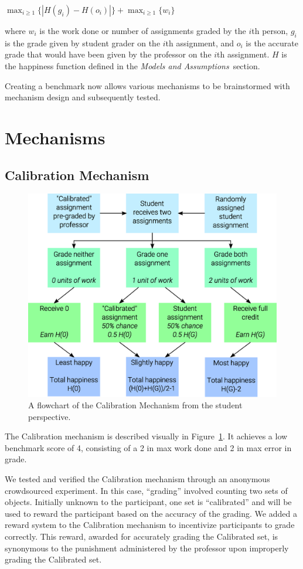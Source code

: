\documentclass{chi-ext}
\begin{document}
$\max_{i \ge 1} \{|H(g_i)-H(o_i)|\} + \max_{i \ge 1} \{w_i\}$

where $w_i$ is the work done or number of assignments graded by the $i$th person, $g_i$ is the grade given by student grader on the $i$th assignment, and $o_i$ is the accurate grade that would have been given by the professor on the $i$th assignment. $H$ is the happiness function defined in the \textit{Models and Assumptions}~section.

Creating a benchmark now allows various mechanisms to be brainstormed with mechanism design and subsequently tested.
\section{Mechanisms}
\subsection{Calibration Mechanism}

\begin{figure}
  \centering
  \includegraphics[width=\linewidth]{Calibration-Flowchart.eps}
  \caption{A flowchart of the Calibration Mechanism from the student perspective.}
  \label{fig:calibration}
\end{figure}

The Calibration mechanism is described visually in Figure~\ref{fig:calibration}. It achieves a low benchmark score of 4, consisting of a 2 in max work done and 2 in max error in grade.

We tested and verified the Calibration mechanism through an anonymous crowdsourced experiment. In this case, ``grading'' involved counting two sets of objects. Initially unknown to the participant, one set is ``calibrated'' and will be used to reward the participant based on the accuracy of the grading. We added a reward system to the Calibration mechanism to incentivize participants to grade correctly. This reward, awarded for accurately grading the Calibrated set, is synonymous to the punishment administered by the professor upon improperly grading the Calibrated set.
\end{document}
